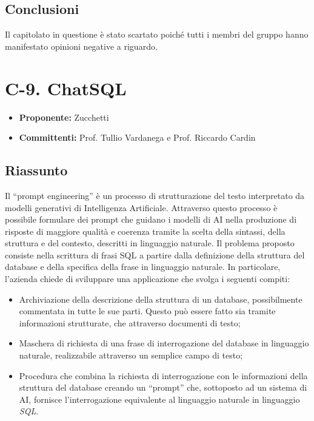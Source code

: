 \documentclass{article}
\begin{document}
\subsection{Conclusioni}
Il capitolato in questione è stato scartato poiché tutti i membri del gruppo hanno manifestato opinioni negative a riguardo.








\newpage

\section{C-9. ChatSQL}
\begin{itemize}
    \item \textbf{Proponente:} Zucchetti
    \item \textbf{Committenti:}  Prof. Tullio Vardanega e Prof. Riccardo Cardin
\end{itemize}

\subsection{Riassunto}
Il “prompt engineering” è un processo di strutturazione del testo interpretato da modelli generativi di Intelligenza Artificiale.
Attraverso questo processo è possibile formulare dei prompt che guidano i modelli di AI nella produzione di risposte di maggiore qualità e coerenza tramite la scelta della sintassi, della struttura e del contesto, descritti in linguaggio naturale.
Il problema proposto consiste nella scrittura di frasi SQL a partire dalla definizione della struttura del database e della specifica della frase in linguaggio naturale.
In particolare, l’azienda chiede di sviluppare una applicazione che svolga i seguenti compiti:


\begin{itemize}
    \item Archiviazione della descrizione della struttura di un database, possibilmente commentata in tutte le sue parti. Questo può essere fatto sia tramite informazioni strutturate, che attraverso documenti di testo;
    \item Maschera di richiesta di una frase di interrogazione del database in linguaggio naturale, realizzabile attraverso un semplice campo di testo;
    \item Procedura che combina la richiesta di interrogazione con le informazioni della struttura del database creando un “prompt” che, sottoposto ad un sistema di AI, fornisce l’interrogazione equivalente al linguaggio naturale in linguaggio \textit{SQL}.
\end{itemize}
\end{document}

